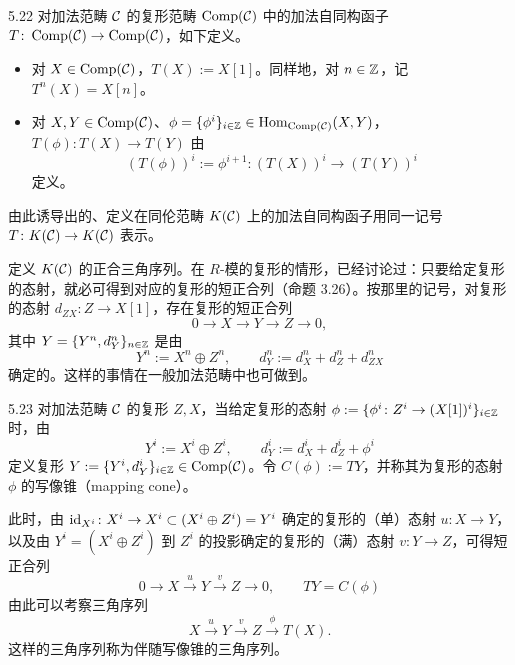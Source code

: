 \begin{definition}{5.22}
对加法范畴 $\mathcal{C}$ 的复形范畴 $\operatorname{Comp}(\mathcal{C})$ 中的加法自同构函子 $T\colon\operatorname{Comp}(\mathcal{C})\to\operatorname{Comp}(\mathcal{C})$，如下定义。
\begin{itemize}[leftmargin=2em, itemsep=0.2em]
\item 对 $X\in\operatorname{Comp}(\mathcal{C})$，$T(X) := X[1]$。同样地，对 $n\in\mathbb{Z}$，记 $T^n(X)=X[n]$。
\item 对 $X,Y\in\operatorname{Comp}(\mathcal{C})$、$\phi=\{\phi^i\}_{i\in\mathbb{Z}}\in\operatorname{Hom}_{\operatorname{Comp}(\mathcal{C})}(X,Y)$，$T(\phi)\colon T(X)\to T(Y)$ 由
\[
(T(\phi))^i := \phi^{i+1}\colon (T(X))^i\to(T(Y))^i
\]
定义。
\end{itemize}
由此诱导出的、定义在同伦范畴 $K(\mathcal{C})$ 上的加法自同构函子用同一记号 $T\colon K(\mathcal{C})\to K(\mathcal{C})$ 表示。
\end{definition}

定义 $K(\mathcal{C})$ 的正合三角序列。在 $R$-模的复形的情形，已经讨论过：只要给定复形的态射，就必可得到对应的复形的短正合列（命题 3.26）。按那里的记号，对复形的态射 $d_{ZX}\colon Z\to X[1]$，存在复形的短正合列
\[
0\to X\to Y\to Z\to 0,
\]
其中 $Y=\{Y^n,d^n_Y\}_{n\in\mathbb{Z}}$ 是由
\[
Y^n := X^n\oplus Z^n,\qquad d^n_Y := d^n_X+d^n_Z+d^n_{ZX}
\]
确定的。这样的事情在一般加法范畴中也可做到。

\begin{definition}{5.23}
对加法范畴 $\mathcal{C}$ 的复形 $Z,X$，当给定复形的态射 $\phi := \{\phi^i\colon Z^i\to(X[1])^i\}_{i\in\mathbb{Z}}$ 时，由
\[
Y^i := X^i\oplus Z^i,\qquad d^i_Y := d^i_X+d^i_Z+\phi^i
\]
定义复形 $Y := \{Y^i,d^i_Y\}_{i\in\mathbb{Z}}\in\operatorname{Comp}(\mathcal{C})$。令 $C(\phi) := TY$，并称其为复形的态射 $\phi$ 的写像锥（mapping cone）。
\end{definition}


此时，由 $\mathrm{id}_{X^i}\colon X^i\to X^i\subset(X^i\oplus Z^i)=Y^i$ 确定的复形的（单）态射 $u\colon X\to Y$，以及由 $Y^i=(X^i\oplus Z^i)$ 到 $Z^i$ 的投影确定的复形的（满）态射 $v\colon Y\to Z$，可得短正合列
\begin{equation}
0\longrightarrow X\xrightarrow{u}Y\xrightarrow{v}Z\longrightarrow 0,\qquad TY=C(\phi) \tag{5.7}
\end{equation}
由此可以考察三角序列
\[
X\xrightarrow{u}Y\xrightarrow{v}Z\xrightarrow{\phi}T(X).
\]
这样的三角序列称为伴随写像锥的三角序列。

